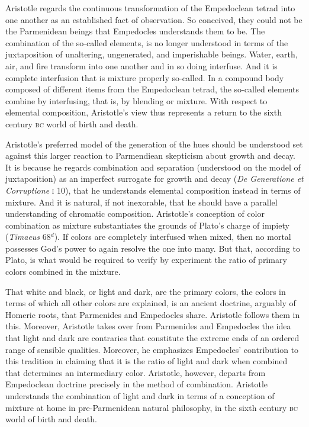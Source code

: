 Aristotle regards the continuous transformation of the Empedoclean tetrad into one another as an established fact of observation. So conceived, they could not be the Parmenidean beings that Empedocles understands them to be. The combination of the so-called elements, is no longer understood in terms of the juxtaposition of unaltering, ungenerated, and imperishable beings. Water, earth, air, and fire transform into one another and in so doing interfuse. And it is complete interfusion that is mixture properly so-called. In a compound body composed of different items from the Empedoclean tetrad, the so-called elements combine by interfusing, that is, by blending or mixture. With respect to elemental composition, Aristotle's view thus represents a return to the sixth century \textsc{bc} world of birth and death.

Aristotle's preferred model of the generation of the hues should be understood set against this larger reaction to Parmendiean skepticism about growth and decay. It is because he regards combination and separation (understood on the model of juxtaposition) as an imperfect surrogate for growth and decay (\emph{De Generatione et Corruptione} \textsc{i} 10), that he understands elemental composition instead in terms of mixture. And it is natural, if not inexorable, that he should have a parallel understanding of chromatic composition. Aristotle's conception of color combination as mixture substantiates the grounds of Plato's charge of impiety (\emph{Timaeus} 68\( ^{d} \)). If colors are completely interfused when mixed, then no mortal possesses God's power to again resolve the one into many. But that, according to Plato, is what would be required to verify by experiment the ratio of primary colors combined in the mixture.

That white and black, or light and dark, are the primary colors, the colors in terms of which all other colors are explained, is an ancient doctrine, arguably of Homeric roots, that Parmenides and Empedocles share. Aristotle follows them in this. Moreover, Aristotle takes over from Parmenides and Empedocles the idea that light and dark are contraries that constitute the extreme ends of an ordered range of sensible qualities. Moreover, he emphasizes Empedocles' contribution to this tradition in claiming that it is the ratio of light and dark when combined that determines an intermediary color. Aristotle, however, departs from Empedoclean doctrine precisely in the method of combination. Aristotle understands the combination of light and dark in terms of a conception of mixture at home in pre-Parmenidean natural philosophy, in the sixth century \textsc{bc} world of birth and death. 

